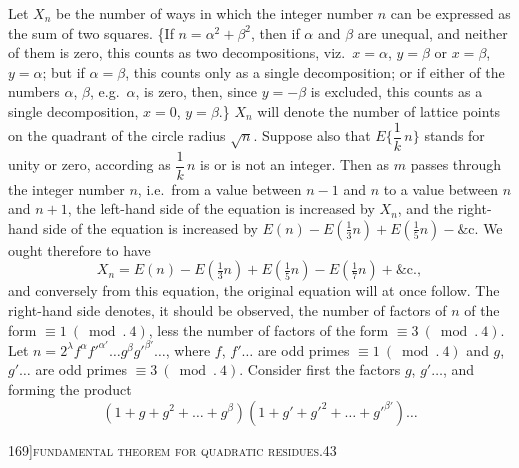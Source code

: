 \documentclass[11pt]{article}
\begin{document}
Let $X_{n}$ be the number of ways in which the integer number $n$ can be expressed
as the sum of two squares. \{If $n = \alpha^{2} + \beta^{2}$, then if $\alpha$ and $\beta$ are unequal, and neither
of them is zero, this counts as two decompositions, viz.\ $x = \alpha$, $y = \beta$ or $x = \beta$, $y = \alpha$;
but if $\alpha = \beta$, this counts only as a single decomposition; or if either of the numbers
$\alpha$, $\beta$, e.g.\ $\alpha$, is zero, then, since $y = -\beta$ is excluded, this counts as a single decomposition,
$x = 0$, $y = \beta$.\} $X_{n}$ will denote the number of lattice points on the quadrant of the
circle radius $\sqrt{n}$. Suppose also that $E\biggl\{\dfrac{1}{k}\,n\biggr\}$ stands for unity or zero, according as $\dfrac{1}{k}\,n$
is or is not an integer. Then as $m$ passes through the integer number $n$, i.e.\ from
a value between $n - 1$ and $n$ to a value between $n$ and $n + 1$, the left-hand side of
the equation is increased by $X_{n}$, and the right-hand side of the equation is increased
by $E(n) - E(\tfrac{1}{3} n) + E(\tfrac{1}{5} n) - \&\text{c.}$ We ought therefore to have
\[
X_{n} = E(n) - E(\tfrac{1}{3} n) + E(\tfrac{1}{5} n) - E(\tfrac{1}{7} n) + \&\text{c.},
\]
and conversely from this equation, the original equation will at once follow. The
right-hand side denotes, it should be observed, the number of factors of $n$ of the
form $\equiv 1\ (\bmod.\ 4)$, less the number of factors of the form $\equiv 3\ (\bmod.\ 4)$. Let
$n = 2^{\lambda}f^{\alpha}f'^{\alpha'}\ldots g^{\beta}g'^{\beta'}\ldots$, where $f$, $f'\ldots$ are odd primes $\equiv 1\ (\bmod.\ 4)$ and $g$, $g'\ldots$ are odd
primes $\equiv 3\ (\bmod.\ 4)$. Consider first the factors $g$, $g'\ldots$, and forming the product
\[
(1 + g + g^{2} + \ldots + g^{\beta})(1 + g' + g'^{2} + \ldots + g'^{\beta'})\ldots
\]

\newpage

\begin{center}
\small 169]\hfill\textsc{fundamental theorem for quadratic residues.}\hfill\textsc{43}
\end{center}

\medskip
\end{document}
